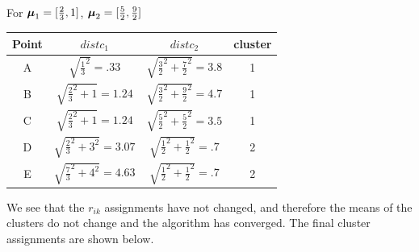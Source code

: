 \documentclass[12pt,letterpaper]{article}
\begin{document}
\begin{enumerate}
\begin{solution}
\begin{align*}
\end{align*}
For $\boldsymbol{\mu}_1 = [\frac{2}{3},1]$, $\boldsymbol{\mu}_2 = [\frac{5}{2},\frac{9}{2}]$
\begin{center}
\begin{tabular}{ |c|c|c|c| } 
 \hline
 Point & $distc_1 $& $distc_2$ & cluster \\ 
 \hline 
 A & $\sqrt{\frac{1}{3}^2} = .33$ & $\sqrt{\frac{3}{2}^2 + \frac{7}{2}^2} = 3.8$ & 1\\ 
 B &   $\sqrt{\frac{2}{3}^2 + 1} = 1.24$ &  $\sqrt{\frac{3}{2}^2 + \frac{9}{2}^2} = 4.7$ & 1\\ 
 C &  $\sqrt{\frac{2}{3}^2 + 1} = 1.24$& $\sqrt{\frac{5}{2}^2 + \frac{5}{2}^2} = 3.5$ & 1 \\ 
 D & $\sqrt{\frac{2}{3}^2 + 3^2} = 3.07$ & $\sqrt{\frac{1}{2}^2 + \frac{1}{2}^2} = .7$ & 2\\
 E & $\sqrt{\frac{7}{3}^2 + 4^2} = 4.63$ & $\sqrt{\frac{1}{2}^2 + \frac{1}{2}^2} = .7$& 2\\  
 \hline
\end{tabular}
\end{center}

We see that the $r_{ik}$ assignments have not changed, and therefore the means of the clusters do not change and the algorithm has converged. The final cluster assignments are shown below.

\begin{center}
\end{center}
\end{solution}



\end{enumerate}
\end{document}
